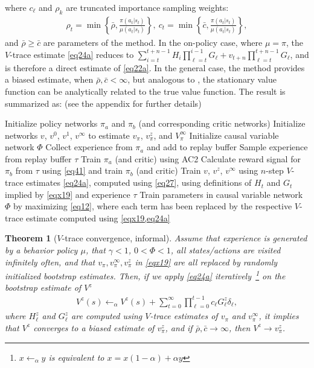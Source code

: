\documentclass[letterpaper]{article} %
\newtheorem{theorem}{Theorem}%
\begin{document}
	where $c_\ell$ and $\rho_k$ are truncated importance sampling weights: 
	\begin{align} 
		\rho_t = \min\left\{\bar \rho, \frac{\pi(a_t | s_t)  }{\mu(a_t | s_t) }  \right\},\
		c_t = \min\left\{\bar c, \frac{\pi(a_t | s_t)  }{\mu(a_t | s_t) }  \right\}, \nonumber
	\end{align}
	and $\bar \rho \geq \bar c$ are parameters of the method. In the on-policy case, where $\mu = \pi$, the $V$-trace estimate \cref{eq24a} reduces to $\sum_{i=t}^{t+n-1} H_i \prod_{\ell=t}^{i-1} G_\ell + v_{t+n}  \prod_{\ell = t}^{ t+n-1} G_\ell$,  
	and is therefore a direct estimate of \cref{eq22a}. In the general case, the method provides a biased estimate, when $\bar \rho, \bar c < \infty$, but analogous to \citet{espeholt2018impala}, the stationary value function can be analytically related to the true value function. The result is summarized as: (see the appendix for further details) 
	\begin{algorithm}[t] 
		\caption{Causal learner}\label{alg1}
		\begin{algorithmic}[1]
			\STATE Initialize policy networks $\pi_a$ and $\pi_b$ (and corresponding critic networks)
			\STATE Initialize networks $v$, $v^{0}$, $v^{1}$, $v^{\infty}$ to estimate $v_\pi$, $v^{z}_\pi$,  and $V^\infty_\pi$		
			\STATE Initialize causal variable network $\Phi$ 
			\REPEAT
			\STATE Collect experience from $\pi_a$ and add to replay buffer
			\STATE Sample experience from replay buffer $\tau$
			\STATE Train $\pi_a$ (and critic) using AC2
			\STATE Calculate reward signal for $\pi_b$ from $\tau$ using \cref{eq41} and train $\pi_b$ (and critic)
			\STATE Train $v$, $v^{z}$, $v^{\infty}$ using $n$-step $V$-trace estimates \cref{eq24a}, computed using \cref{eq27}, using definitions of $H_t$ and $G_t$ implied by \cref{eqx19} and experience $\tau$
			\STATE Train parameters in causal variable network $\Phi$ by maximizing \cref{eq12}, where each term has been replaced by the respective $V$-trace estimate computed using \cref{eqx19,eq24a}
			\UNTIL{forever}
		\end{algorithmic}
	\end{algorithm}
	
	\begin{theorem}[$V$-trace convergence, informal]	\label{T2}
		Assume that experience is generated by a behavior policy $\mu$, that  $\gamma<1$, $0<\Phi<1$, all states/actions are visited infinitely often, and that $v_\pi, v^\infty_\pi, v^z_\pi$ in \cref{eqx19} are all replaced by randomly initialized bootstrap estimates. Then, if we apply \cref{eq24a} iteratively~\footnote{$x \leftarrow_\alpha y$ is equivalent to $x = x(1-\alpha) + \alpha y$} on the bootstrap estimate of $V^z$ 
		\begin{align}
			V^z(s) \leftarrow_\alpha V^z(s) + \sum_{t=0}^{\infty} \prod_{\ell =0}^{t-1} c_\ell G_\ell^z \delta_\ell,
		\end{align}
		where $H_\ell^z$ and $G^z_\ell$ are computed using $V$-trace estimates of $v_\pi$ and $v^\infty_\pi$, it implies that $V^z$ converges to a biased estimate of $v^z_\pi$, and if $\bar \rho, \bar c \rightarrow \infty$, then $V^z \rightarrow v_\pi^z$. 
	\end{theorem}
	
\end{document}
